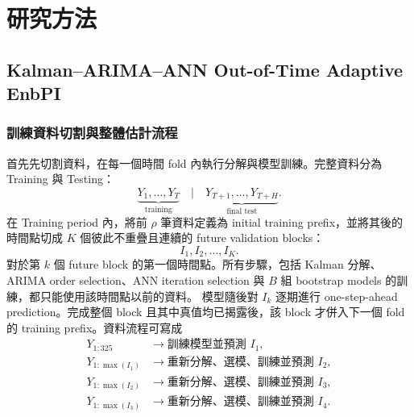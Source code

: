 \frontmatter
{} %
{\selectfont

% 


\mainmatter
{} %


\section*{研究方法}

\subsection*{Kalman--ARIMA--ANN Out-of-Time Adaptive EnbPI}


\subsubsection*{訓練資料切割與整體估計流程}

首先先切割資料，在每一個時間 fold 內執行分解與模型訓練。完整資料分為 Training 與 Testing：
\[
    \underbrace{Y_1,\ldots,Y_T}_{\text{training}}
    \quad\Big|\quad
    \underbrace{Y_{T+1},\ldots,Y_{T+H}}_{\text{final test}}.
\]
在 Training period 內，將前 $\rho$ 筆資料定義為 initial training prefix，並將其後的時間點切成 $K$ 個彼此不重疊且連續的 future validation blocks：
\[
    I_1,I_2,\ldots,I_K.
\]
對於第 $k$ 個 future block 的第一個時間點。所有步驟，包括 Kalman 分解、ARIMA order selection、ANN iteration selection 與 $B$ 組 bootstrap models 的訓練，都只能使用該時間點以前的資料。
模型隨後對 $I_k$ 逐期進行 one-step-ahead prediction。完成整個 block 且其中真值均已揭露後，該 block 才併入下一個 fold 的 training prefix。資料流程可寫成
\[
\begin{aligned}
Y_{1:325}
&\longrightarrow \text{訓練模型並預測 }I_1,\\
Y_{1:\max(I_1)}
&\longrightarrow \text{重新分解、選模、訓練並預測 }I_2,\\
Y_{1:\max(I_2)}
&\longrightarrow \text{重新分解、選模、訓練並預測 }I_3,\\
Y_{1:\max(I_3)}
&\longrightarrow \text{重新分解、選模、訓練並預測 }I_4.
\end{aligned}
\]

}
